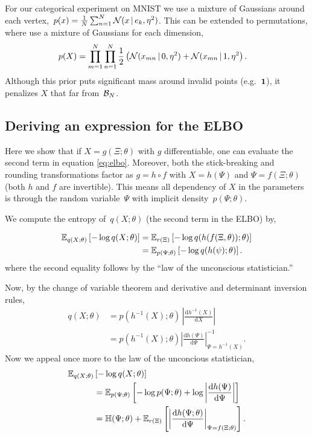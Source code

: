 \documentclass[twoside]{article}
\begin{document}
For our categorical experiment on MNIST we use a mixture of Gaussians
around each
vertex,~${p(x) = \tfrac{1}{N} \sum_{n=1}^N \mathcal{N}(x \, | \, e_k,
  \eta^2)}$.  This can be extended to permutations, where use a
mixture of Gaussians for each dimension,
\begin{align}
\label{eq:permprior}
  \nonumber p(X) &= \prod_{m=1}^N \prod_{n=1}^N
  \frac{1}{2} \left(\mathcal{N}(x_{mn} \, | \, 0, \eta^2) + \mathcal{N}(x_{mn} \, | \, 1, \eta^2 \right).
  \end{align}
Although this prior puts significant mass around invalid points
(e.g.~$\boldsymbol{1}$), it penalizes $X$ that far from~$\mathcal{B}_N$.

\subsection{Deriving an expression for the ELBO}
Here we show that if $X=g(\Xi;\theta)$ with $g$ differentiable, one can
evaluate the second term in equation \eqref{eq:elbo}.  Moreover, both
the stick-breaking and rounding transformations factor as
${g=h \circ f}$ with ${X = h(\Psi)}$ and ${\Psi = f(\Xi; \theta)}$
(both $h$ and $f$ are invertible). This means all dependency of $X$ in
the parameters is through the random variable~$\Psi$ with implicit
density~$p(\Psi; \theta)$.

We compute the entropy of~$q(X; \theta)$ (the second term in the ELBO)
by,

\begin{align*}
  \mathbb{E}_{q(X; \theta)} \left[- \log q(X; \theta) \right]
  &=
    \mathbb{E}_{r(\Xi)} \left[- \log q(h(f(\Xi,\theta)); \theta) \right] \\
  &= \mathbb{E}_{p(\Psi;\theta)} \left[- \log q(h(\psi); \theta) \right]. 
\end{align*}
where the second equality follows by the ``law of the unconscious statistician.''

Now, by the change of variable theorem and derivative and determinant
inversion rules,
\begin{align*}
  q(X; \theta)
  &= p(h^{-1}(X) ;\theta) \,
    \left| \frac{\mathrm{d} h^{-1}(X)}{\mathrm{d}X} \right| \\
  &= p(h^{-1}(X); \theta)
    \left| \frac{\mathrm{d}h(\Psi)}{\mathrm{d}\Psi} \right|^{-1}_{\Psi = h^{-1}(X)}.
 \end{align*}
Now we appeal once more to the law of the unconcious statistician,
\begin{eqnarray}
\label{eq:elbo2}
  \mathbb{E}_{q(X; \theta)}& \left[- \log q(X; \theta) \right] \\ \nonumber
  &= \mathbb{E}_{p(\Psi;\theta)} \left[ - \log p(\Psi;\theta) +
     \log \left| \frac{\mathrm{d} h(\Psi)}{\mathrm{d}\Psi} \right| \right] \\
  &= \mathbb{H}(\Psi; \theta)  +
  \mathbb{E}_{r(\Xi)}\left[\left| \frac{\mathrm{d}h(\Psi; \theta)}{\mathrm{d}\Psi} \right|_{\Psi = f(\Xi; \theta)} \right].
\end{eqnarray}
 
\end{document}

